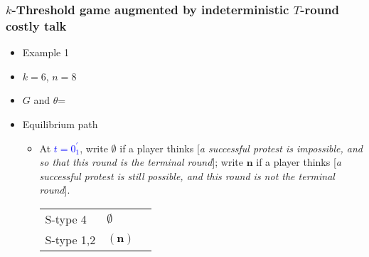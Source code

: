 \documentclass[9pt]{beamer}
\begin{document}
\begin{frame}
  \frametitle{$k$-Threshold game augmented by indeterministic $T$-round costly talk}

\begin{itemize}
\item Example 1
\item $k=6$, $n=8$
\item $G$ and $\theta$=
\begin{center}
\end{center}
\end{itemize}

\begin{itemize}
\item Equilibrium path
\begin{itemize}
\item 

At \textcolor{blue}{$t=0^{'}_1$}, write $\emptyset$ if a player thinks \alert{[}\textit{a successful protest is impossible, and so that this round is the terminal round}\alert{]}; write ${\textbf{n}}$ if a player thinks \alert{[}\textit{a successful protest is still possible, and this round is not the terminal round}\alert{]}. 
\begin{table}[h]
\begin{tabular}{ll l}
S-type 4 & $\emptyset$\\
S-type 1,2 & $({\textbf{n}})$
\end{tabular}
\end{table}


\end{itemize}
\end{itemize}

\end{frame}
\end{document}
